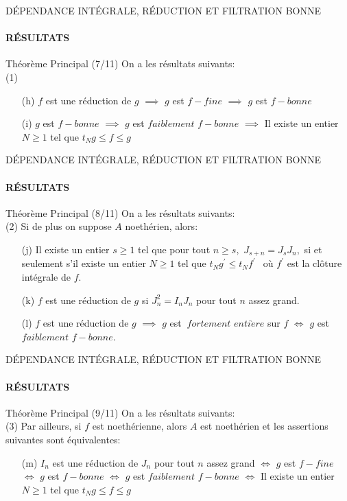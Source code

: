 \documentclass[11pt,a4paper]{beamer}
\begin{document}
\begin{frame}{DÉPENDANCE INTÉGRALE, RÉDUCTION ET FILTRATION BONNE}
	\framesubtitle{RÉSULTATS}
	\begin{block}{Théorème Principal (7/11)}
		On a les résultats suivants:\\
		(1)
		\begin{enumerate}
			\item[(h)] $f$ est une réduction de $g$ $\implies$ $g$ est $f-fine$ $\implies$ $g$ est $f-bonne$
			\item[(i)] $g$ est $f-bonne$ $\implies$  $g$ est $faiblement$ $f-bonne$ $\implies$ Il existe un entier $N\geq 1$ tel que $t_{N}g\leq f\leq g$
		\end{enumerate}
	\end{block}
\end{frame}

\begin{frame}{DÉPENDANCE INTÉGRALE, RÉDUCTION ET FILTRATION BONNE}
	\framesubtitle{RÉSULTATS}
	\begin{block}{Théorème Principal (8/11)}
		On a les résultats suivants:\\
		(2) Si de plus on suppose $A$ noethérien, alors:
		\begin{enumerate}
			\item[(j)] Il existe un entier $s\geq 1$ tel que pour tout $n\geq s,$ $J_{s+n}=J_{s}J_{n},$ si et seulement s'il existe un entier $N\geq 1$ tel que $t_{N}g^{\prime }\leq
			t_{N}f^{\prime \text{ }}$ où $f^{\prime }$ est la clôture intégrale de $f.$
			
			\item[(k)] $f$ est une réduction de $g$ si $J_{n}^{2}=I_{n}J_{n}$ pour tout $n$ assez grand.
			
			\item[(l)] $f$ est une réduction de $g$ $\implies$ $g$ est $\ fortement$ $enti\grave{e}re$ sur $f$ $\Longleftrightarrow$ $g$ est $faiblement$ $f-bonne.$
		\end{enumerate}
	\end{block}
\end{frame}

\begin{frame}{DÉPENDANCE INTÉGRALE, RÉDUCTION ET FILTRATION BONNE}
	\framesubtitle{RÉSULTATS}
	\begin{block}{Théorème Principal (9/11)}
		On a les résultats suivants:\\
		(3) Par ailleurs, si $f$ est noethérienne, alors $A$ est noethérien et les assertions suivantes sont équivalentes:
		\begin{enumerate}
			\item[(m)] $I_{n}$ est une réduction de $J_{n}$ pour tout $n$ assez grand $\Longleftrightarrow$ $g$ est $f-fine$ $\Longleftrightarrow$ $g$ est $f-bonne$ $\Longleftrightarrow$ $g$ est $faiblement$ $f-bonne$ $\Longleftrightarrow$ Il existe un entier $N\geq 1$ tel que $t_{N}g\leq f\leq g$
		\end{enumerate}
	\end{block}
\end{frame}
\end{document}
